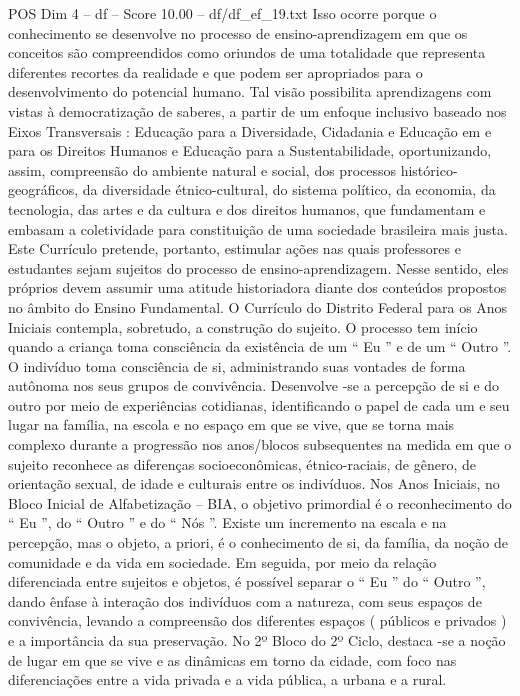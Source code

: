 \begin{textsample}{POS Dim 4 – df – Score 10.00 – df/df\_ef\_19.txt}
Isso ocorre porque o conhecimento se desenvolve no processo de ensino-aprendizagem em que os conceitos são compreendidos como oriundos de uma totalidade que representa diferentes recortes da realidade e que podem ser apropriados para o desenvolvimento do potencial humano.
Tal visão possibilita aprendizagens com vistas à democratização de saberes, a partir de um enfoque inclusivo baseado nos Eixos Transversais : Educação para a Diversidade, Cidadania e Educação em e para os Direitos Humanos e Educação para a Sustentabilidade, oportunizando, assim, compreensão do ambiente natural e social, dos processos histórico-geográficos, da diversidade étnico-cultural, do sistema político, da economia, da tecnologia, das artes e da cultura e dos direitos humanos, que fundamentam e embasam a coletividade para constituição de uma sociedade brasileira mais justa.
Este Currículo pretende, portanto, estimular ações nas quais professores e estudantes sejam sujeitos do processo de ensino-aprendizagem.
Nesse sentido, eles próprios devem assumir uma atitude historiadora diante dos conteúdos propostos no âmbito do Ensino Fundamental.
O Currículo do Distrito Federal para os Anos Iniciais contempla, sobretudo, a construção do sujeito.
O processo tem início quando a criança toma consciência da existência de um “ Eu ” e de um “ Outro ”.
O indivíduo toma consciência de si, administrando suas vontades de forma autônoma nos seus grupos de convivência.
Desenvolve -se a percepção de si e do outro por meio de experiências cotidianas, identificando o papel de cada um e seu lugar na família, na escola e no espaço em que se vive, que se torna mais complexo durante a progressão nos anos/blocos subsequentes na medida em que o sujeito reconhece as diferenças socioeconômicas, étnico-raciais, de gênero, de orientação sexual, de idade e culturais entre os indivíduos.
Nos Anos Iniciais, no Bloco Inicial de Alfabetização – BIA, o objetivo primordial é o reconhecimento do “ Eu ”, do “ Outro ” e do “ Nós ”.
Existe um incremento na escala e na percepção, mas o objeto, a priori, é o conhecimento de si, da família, da noção de comunidade e da vida em sociedade.
Em seguida, por meio da relação diferenciada entre sujeitos e objetos, é possível separar o “ Eu ” do “ Outro ”, dando ênfase à interação dos indivíduos com a natureza, com seus espaços de convivência, levando a compreensão dos diferentes espaços ( públicos e privados ) e a importância da sua preservação.
No 2º Bloco do 2º Ciclo, destaca -se a noção de lugar em que se vive e as dinâmicas em torno da cidade, com foco nas diferenciações entre a vida privada e a vida pública, a urbana e a rural.

\end{textsample}

